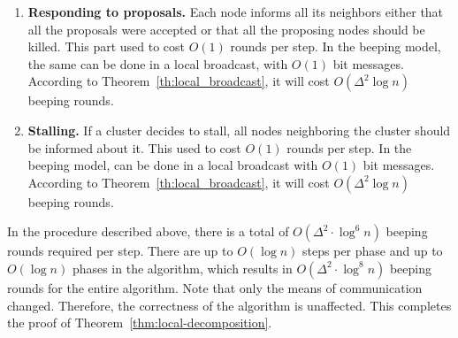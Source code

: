 \begin{enumerate}
    \item \textbf{Responding to proposals.} Each node informs all its neighbors either that all the proposals were accepted or that all the proposing nodes should be killed. This part used to cost $O(1)$ \congest rounds per step. In the beeping model, the same can be done in a local broadcast, with $O(1)$ bit messages. According to Theorem~\ref{th:local_broadcast}, it will cost $O(\Delta^2 \log n)$ beeping rounds.
    \item \textbf{Stalling.} If a cluster decides to stall, all nodes neighboring the cluster should be informed about it. This  used to cost $O(1)$ \congest rounds per step. In the beeping model,  can be done in a local broadcast with $O(1)$ bit messages. According to Theorem~\ref{th:local_broadcast}, it will cost $O(\Delta^2 \log n)$ beeping rounds.
\end{enumerate}

In the procedure described above, there is a total of $O(\Delta^2 \cdot \log^6 n)$ beeping rounds required per step. There are up to $O(\log n)$ steps per phase and up to $O(\log n)$ phases in the algorithm, which results in $O(\Delta^2 \cdot \log^8 n)$ beeping rounds for the entire algorithm. Note that only the means of communication changed. Therefore, the correctness of the algorithm is unaffected. This completes the proof of Theorem~\ref{thm:local-decomposition}.





